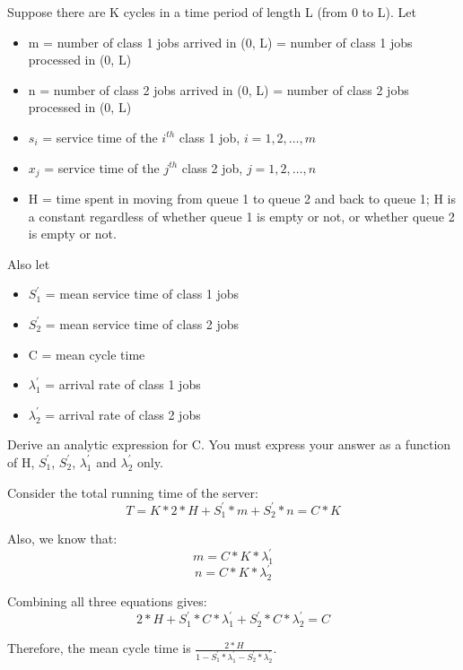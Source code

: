 \documentclass[12pt]{article}
\begin{document}
\begin{enumerate}
\begin{enumerate}
Suppose there are K cycles in a time period of length L (from 0 to L). Let
\begin{itemize}
\item{} m = number of class 1 jobs arrived in (0, L) = number of class 1 jobs processed in (0, L)
\item{} n = number of class 2 jobs arrived in (0, L) = number of class 2 jobs processed in (0, L)
\item{} $s_i$ = service time of the $i^{th}$ class 1 job, $i = 1, 2, \dotsc, m$
\item{} $x_j$ = service time of the $j^{th}$ class 2 job, $j = 1, 2, \dotsc, n$
\item{} H = time spent in moving from queue 1 to queue 2 and back to queue 1; H is a constant regardless of whether queue 1 is empty or not, or whether queue 2 is empty or not.
\end{itemize}

Also let
\begin{itemize}
\item{} $S_1^{'}$ = mean service time of class 1 jobs
\item{} $S_2^{'}$ = mean service time of class 2 jobs
\item{} C = mean cycle time
\item{} $\lambda_1^{'}$ = arrival rate of class 1 jobs
\item{} $\lambda_2^{'}$ = arrival rate of class 2 jobs
\end{itemize}
Derive an analytic expression for C. You must express your answer as a function of H, $S_1^{'}$, $S_2^{'}$, $\lambda_1^{'}$ and $\lambda_2^{'}$ only.

Consider the total running time of the server:
\begin{equation}
T = K * 2 * H + S_1^{'} * m + S_2^{'} * n = C * K
\end{equation}

Also, we know that:
\begin{equation}
m = C * K * \lambda_1^{'}
\end{equation}
\begin{equation}
n = C * K * \lambda_2^{'}
\end{equation}

Combining all three equations gives:
\begin{equation}
2 * H + S_1^{'} * C * \lambda_1^{'} + S_2^{'} * C * \lambda_2^{'} = C
\end{equation}

Therefore, the mean cycle time is $\frac{2 * H}{1 - S_1^{'} * \lambda_1^{'} - S_2^{'} * \lambda_2^{'}}$.


\end{enumerate}
\end{enumerate}
\end{document}
